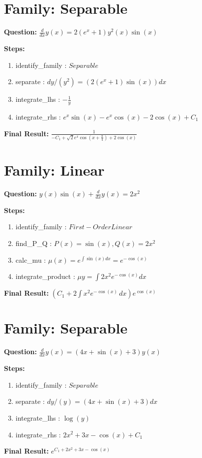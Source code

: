 \documentclass{article}
\begin{document}
\section*{Family: Separable}
\textbf{Question:} $\frac{d}{d x} y{\left(x \right)} = 2 \left(e^{x} + 1\right) y^{2}{\left(x \right)} \sin{\left(x \right)}$

\textbf{Steps:}
\begin{enumerate}
\item identify_family :  $Separable$
\item separate :  $dy / (y^{2}) = (2 \left(e^{x} + 1\right) \sin{\left(x \right)}) dx$
\item integrate_lhs :  $- \frac{1}{y}$
\item integrate_rhs :  $e^{x} \sin{\left(x \right)} - e^{x} \cos{\left(x \right)} - 2 \cos{\left(x \right)} + C_1$
\end{enumerate}
\textbf{Final Result:} $\frac{1}{- C_{1} + \sqrt{2} e^{x} \cos{\left(x + \frac{\pi}{4} \right)} + 2 \cos{\left(x \right)}}$

\section*{Family: Linear}
\textbf{Question:} $y{\left(x \right)} \sin{\left(x \right)} + \frac{d}{d x} y{\left(x \right)} = 2 x^{2}$

\textbf{Steps:}
\begin{enumerate}
\item identify_family :  $First-Order Linear$
\item find_P_Q :  $P(x)=\sin{\left(x \right)}, Q(x)=2 x^{2}$
\item calc_mu :  $\mu(x) = e^{\int \sin{\left(x \right)} dx} = e^{- \cos{\left(x \right)}}$
\item integrate_product :  $\mu y = \int 2 x^{2} e^{- \cos{\left(x \right)}} dx$
\end{enumerate}
\textbf{Final Result:} $\left(C_{1} + 2 \int x^{2} e^{- \cos{\left(x \right)}}\, dx\right) e^{\cos{\left(x \right)}}$

\section*{Family: Separable}
\textbf{Question:} $\frac{d}{d x} y{\left(x \right)} = \left(4 x + \sin{\left(x \right)} + 3\right) y{\left(x \right)}$

\textbf{Steps:}
\begin{enumerate}
\item identify_family :  $Separable$
\item separate :  $dy / (y) = (4 x + \sin{\left(x \right)} + 3) dx$
\item integrate_lhs :  $\log{\left(y \right)}$
\item integrate_rhs :  $2 x^{2} + 3 x - \cos{\left(x \right)} + C_1$
\end{enumerate}
\textbf{Final Result:} $e^{C_{1} + 2 x^{2} + 3 x - \cos{\left(x \right)}}$
\end{document}
